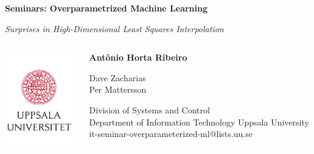 \documentclass[english,aspectratio=1610]{beamer} %
\title[High-Dimensional Least Squares]{\mytitle}
\author{Ant\^{o}nio Horta Ribeiro}
\institute{Uppsala University}
\date{}
\newcommand{\mytitle}{Surprises in High-Dimensional Least Squares Interpolation}
\begin{document}
\begin{frame}{}
	\vspace{-2mm}
	\begin{center}
		\begin{Large}
			\bfseries
		    Seminars: Overparametrized Machine Learning \\[2mm]
		\end{Large}
		\emph{\mytitle}
	\end{center}
	\vspace{-6mm}
	
	\begin{columns}[c]
		\begin{column}{50mm}
			\centering
			
			\vspace{8mm}
			
			\hspace*{4mm}    \includegraphics[width=30mm]{uu_logo}
			
		\end{column}
		\begin{column}{65mm}
			\vspace{10mm}
			
			\textbf{Antônio Horta Ribeiro} \\
			\begin{small}
			    Dave Zacharias \\
			    Per Mattersson
			\end{small}
			
			\vspace{8mm}
			Division of Systems and Control \\
			Department of Information Technology
			Uppsala University \\
			\vspace{5mm}
			{\footnotesize
			it-seminar-overparameterized-ml@lists.uu.se}
		
			
			\par
			\vspace{0.8em}
			
		\end{column}
	\end{columns}
\end{frame}
\end{document}
